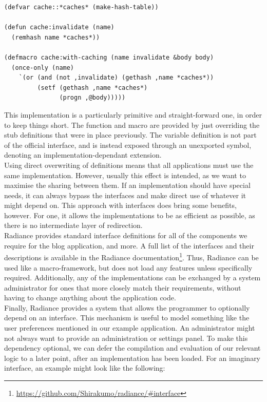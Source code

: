 \documentclass{sig-alternate}
\begin{document}
\begin{verbatim}
(defvar cache::*caches* (make-hash-table))

(defun cache:invalidate (name)
  (remhash name *caches*))

(defmacro cache:with-caching (name invalidate &body body)
  (once-only (name)
    `(or (and (not ,invalidate) (gethash ,name *caches*))
         (setf (gethash ,name *caches*)
               (progn ,@body)))))
\end{verbatim}

This implementation is a particularly primitive and straight-forward one, in order to keep things short. The function and macro are provided by just overriding the stub definitions that were in place previously. The variable definition is not part of the official interface, and is instead exposed through an unexported symbol, denoting an implementation-dependant extension. \\

Using direct overwriting of definitions means that all applications must use the same implementation. However, usually this effect is intended, as we want to maximise the sharing between them. If an implementation should have special needs, it can always bypass the interfaces and make direct use of whatever it might depend on. This approach with interfaces does bring some benefits, however. For one, it allows the implementations to be as efficient as possible, as there is no intermediate layer of redirection. \\

Radiance provides standard interface definitions for all of the components we require for the blog application, and more. A full list of the interfaces and their descriptions is available in the Radiance documentation\footnote{\url{https://github.com/Shirakumo/radiance/\#interface}}. Thus, Radiance can be used like a macro-framework, but does not load any features unless specifically required. Additionally, any of the implementations can be exchanged by a system administrator for ones that more closely match their requirements, without having to change anything about the application code.\\

Finally, Radiance provides a system that allows the programmer to optionally depend on an interface. This mechanism is useful to model something like the user preferences mentioned in our example application. An administrator might not always want to provide an administration or settings panel. To make this dependency optional, we can defer the compilation and evaluation of our relevant logic to a later point, after an implementation has been loaded. For an imaginary  interface, an example might look like the following:
\end{document}
